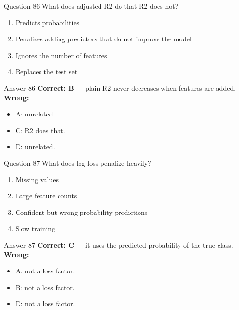\documentclass[aspectratio=169,11pt]{beamer}
\begin{document}
\begin{frame}{Question 86}
What does adjusted R2 do that R2 does not?
\begin{enumerate}[label=\Alph*.]
\item Predicts probabilities
\item Penalizes adding predictors that do not improve the model
\item Ignores the number of features
\item Replaces the test set
\end{enumerate}
\end{frame}
\begin{frame}{Answer 86}
\textbf{Correct: B} --- plain R2 never decreases when features are added.\\
\vspace{0.5em}
\textbf{Wrong:}
\begin{itemize}
\item A: unrelated.
\item C: R2 does that.
\item D: unrelated.
\end{itemize}
\end{frame}

\begin{frame}{Question 87}
What does log loss penalize heavily?
\begin{enumerate}[label=\Alph*.]
\item Missing values
\item Large feature counts
\item Confident but wrong probability predictions
\item Slow training
\end{enumerate}
\end{frame}
\begin{frame}{Answer 87}
\textbf{Correct: C} --- it uses the predicted probability of the true class.\\
\vspace{0.5em}
\textbf{Wrong:}
\begin{itemize}
\item A: not a loss factor.
\item B: not a loss factor.
\item D: not a loss factor.
\end{itemize}
\end{frame}
\end{document}
